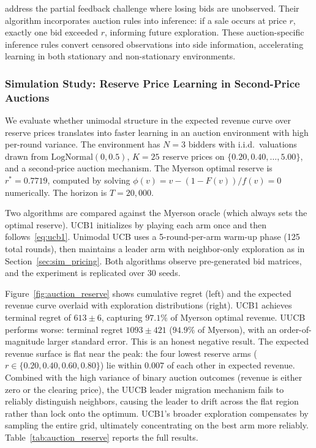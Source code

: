 \citet{Akcay2022} address the partial feedback challenge where losing bids are unobserved. Their algorithm incorporates auction rules into inference: if a sale occurs at price $r$, exactly one bid exceeded $r$, informing future exploration. These auction-specific inference rules convert censored observations into side information, accelerating learning in both stationary and non-stationary environments.

\subsubsection{Simulation Study: Reserve Price Learning in Second-Price Auctions}
\label{sec:sim_auction}

We evaluate whether unimodal structure in the expected revenue curve over reserve prices translates into faster learning in an auction environment with high per-round variance. The environment has $N = 3$ bidders with i.i.d.\ valuations drawn from $\text{LogNormal}(0, 0.5)$, $K = 25$ reserve prices on $\{0.20, 0.40, \ldots, 5.00\}$, and a second-price auction mechanism. The Myerson optimal reserve is $r^* = 0.7719$, computed by solving $\phi(v) = v - (1 - F(v))/f(v) = 0$ numerically. The horizon is $T = 20{,}000$.

Two algorithms are compared against the Myerson oracle (which always sets the optimal reserve). UCB1 initializes by playing each arm once and then follows~\eqref{eq:ucb1}. Unimodal UCB uses a 5-round-per-arm warm-up phase (125 total rounds), then maintains a leader arm with neighbor-only exploration as in Section~\ref{sec:sim_pricing}. Both algorithms observe pre-generated bid matrices, and the experiment is replicated over 30 seeds.

Figure~\ref{fig:auction_reserve} shows cumulative regret (left) and the expected revenue curve overlaid with exploration distributions (right). UCB1 achieves terminal regret of $613 \pm 6$, capturing $97.1\%$ of Myerson optimal revenue. UUCB performs worse: terminal regret $1093 \pm 421$ ($94.9\%$ of Myerson), with an order-of-magnitude larger standard error. This is an honest negative result. The expected revenue surface is flat near the peak: the four lowest reserve arms ($r \in \{0.20, 0.40, 0.60, 0.80\}$) lie within $0.007$ of each other in expected revenue. Combined with the high variance of binary auction outcomes (revenue is either zero or the clearing price), the UUCB leader migration mechanism fails to reliably distinguish neighbors, causing the leader to drift across the flat region rather than lock onto the optimum. UCB1's broader exploration compensates by sampling the entire grid, ultimately concentrating on the best arm more reliably. Table~\ref{tab:auction_reserve} reports the full results.

